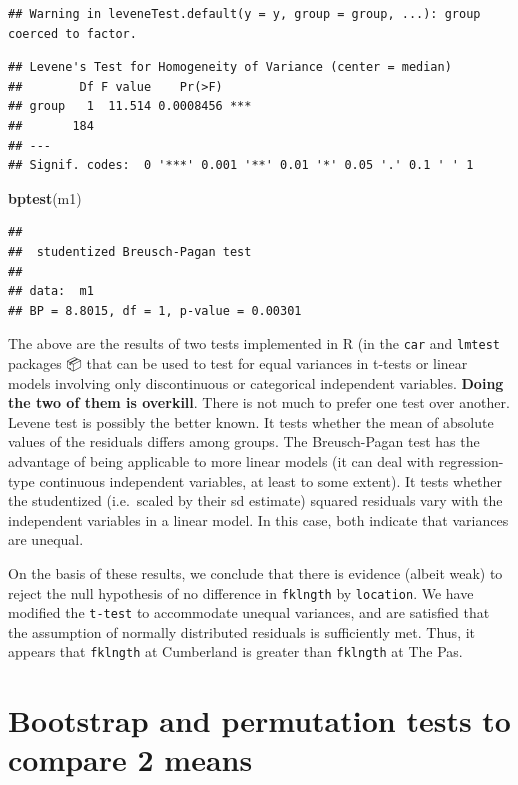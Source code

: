 \documentclass[
  12pt,
]{book}
\newenvironment{Shaded}{\begin{snugshade}}{\end{snugshade}}
\newcommand{\KeywordTok}[1]{\textcolor[rgb]{0.13,0.29,0.53}{\textbf{#1}}}
\newcommand{\NormalTok}[1]{#1}
\begin{document}
\begin{verbatim}
## Warning in leveneTest.default(y = y, group = group, ...): group coerced to factor.
\end{verbatim}

\begin{verbatim}
## Levene's Test for Homogeneity of Variance (center = median)
##        Df F value    Pr(>F)    
## group   1  11.514 0.0008456 ***
##       184                      
## ---
## Signif. codes:  0 '***' 0.001 '**' 0.01 '*' 0.05 '.' 0.1 ' ' 1
\end{verbatim}

\begin{Shaded}
\begin{Highlighting}[]
\KeywordTok{bptest}\NormalTok{(m1)}
\end{Highlighting}
\end{Shaded}

\begin{verbatim}
## 
##  studentized Breusch-Pagan test
## 
## data:  m1
## BP = 8.8015, df = 1, p-value = 0.00301
\end{verbatim}

The above are the results of two tests implemented in R (in the \texttt{car} and \texttt{lmtest} packages 📦 that can be used to test for equal variances in t-tests or linear models involving only discontinuous or categorical independent variables. \textbf{Doing the two of them is overkill}. There is not much to prefer one test over another. Levene test is possibly the
better known. It tests whether the mean of absolute values of the residuals differs among groups. The Breusch-Pagan test has the advantage of being applicable to more linear models (it can deal with regression-type continuous independent variables, at least to some extent). It tests whether the studentized (i.e.~scaled by their sd estimate) squared residuals vary with the independent variables in a linear model. In this case, both indicate that variances are unequal.

On the basis of these results, we conclude that there is evidence (albeit weak) to reject the null hypothesis of no difference in \texttt{fklngth} by \texttt{location}. We have modified the \texttt{t-test} to accommodate unequal variances, and are satisfied that the assumption of normally distributed residuals is sufficiently met. Thus, it appears that \texttt{fklngth} at Cumberland is greater than \texttt{fklngth} at The Pas.

\hypertarget{bootstrap-and-permutation-tests-to-compare-2-means}{%
\section{Bootstrap and permutation tests to compare 2 means}\label{bootstrap-and-permutation-tests-to-compare-2-means}}
\end{document}
